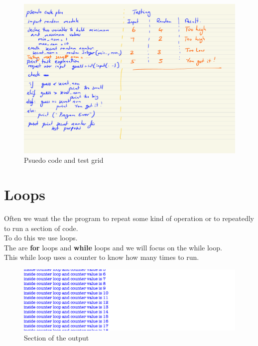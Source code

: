 \documentclass[a4paper,12pt]{article}
\begin{document}
\begin{figure} [!h]
	\centering
	\includegraphics[width=17cm]{iterative_processes/Higher_lower_simple_plan.pdf}
	\caption*{Psuedo code and test grid}
\end{figure}


\newpage
\section{Loops}
Often we want the the program to repeat some kind of operation or to repeatedly to run a section of code.\\
To do this we use loops.\\
The are \textbf{for} loops and \textbf{while} loops and we will focus on the while loop.\\

This while loop uses a counter to know how many times to run.

 \begin{figure} [!h]
	\centering
	\includegraphics[width=17cm]{screen_shots/loop_counter.png}
	\caption*{Section of the output}
\end{figure}
\end{document}
